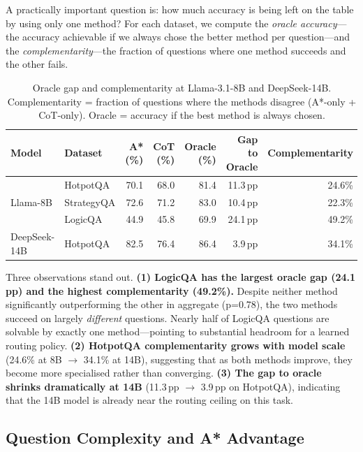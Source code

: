 \documentclass{article}
\begin{document}
A practically important question is: how much accuracy is being left on the table by using only one method? For each dataset, we compute the \emph{oracle accuracy}---the accuracy achievable if we always chose the better method per question---and the \emph{complementarity}---the fraction of questions where one method succeeds and the other fails.

\begin{table}[h]
\centering
\caption{Oracle gap and complementarity at Llama-3.1-8B and DeepSeek-14B. Complementarity = fraction of questions where the methods disagree (A*-only + CoT-only). Oracle = accuracy if the best method is always chosen.}
\label{tab:oracle}
\small
\begin{tabular}{llrrrrr}
\toprule
Model & Dataset & A* (\%) & CoT (\%) & Oracle (\%) & Gap to Oracle & Complementarity \\
\midrule
\multirow{3}{*}{Llama-8B}
  & HotpotQA   & 70.1 & 68.0 & 81.4 & 11.3\,pp & 24.6\% \\
  & StrategyQA & 72.6 & 71.2 & 83.0 & 10.4\,pp & 22.3\% \\
  & LogicQA    & 44.9 & 45.8 & 69.9 & 24.1\,pp & 49.2\% \\
\midrule
DeepSeek-14B & HotpotQA & 82.5 & 76.4 & 86.4 & 3.9\,pp & 34.1\% \\
\bottomrule
\end{tabular}
\end{table}

Three observations stand out. \textbf{(1) LogicQA has the largest oracle gap (24.1\,pp) and the highest complementarity (49.2\%).} Despite neither method significantly outperforming the other in aggregate (p=0.78), the two methods succeed on largely \emph{different} questions. Nearly half of LogicQA questions are solvable by exactly one method---pointing to substantial headroom for a learned routing policy. \textbf{(2) HotpotQA complementarity grows with model scale} (24.6\% at 8B $\to$ 34.1\% at 14B), suggesting that as both methods improve, they become more specialised rather than converging. \textbf{(3) The gap to oracle shrinks dramatically at 14B} (11.3\,pp $\to$ 3.9\,pp on HotpotQA), indicating that the 14B model is already near the routing ceiling on this task.

\subsection{Question Complexity and A* Advantage}
\label{sec:complexity}
\end{document}
